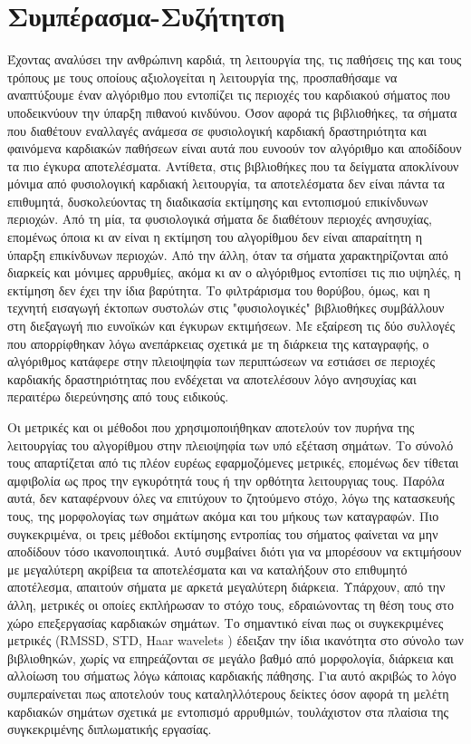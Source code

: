 \gr
\chapter{Συμπέρασμα-Συζήτητση}
Έχοντας αναλύσει την ανθρώπινη καρδιά, τη λειτουργία της, τις παθήσεις της και τους τρόπους με τους οποίους αξιολογείται η λειτουργία της, προσπαθήσαμε να αναπτύξουμε έναν αλγόριθμο που εντοπίζει τις περιοχές του καρδιακού σήματος που υποδεικνύουν την ύπαρξη πιθανού κινδύνου. Όσον αφορά τις βιβλιοθήκες, τα σήματα που διαθέτουν εναλλαγές ανάμεσα σε φυσιολογική καρδιακή δραστηριότητα και φαινόμενα καρδιακών παθήσεων είναι αυτά που ευνοούν τον αλγόριθμο και αποδίδουν τα πιο έγκυρα αποτελέσματα. Αντίθετα, στις βιβλιοθήκες που τα δείγματα αποκλίνουν μόνιμα από φυσιολογική καρδιακή λειτουργία, τα αποτελέσματα δεν είναι πάντα τα επιθυμητά, δυσκολεύοντας τη διαδικασία εκτίμησης και εντοπισμού επικίνδυνων περιοχών. Από τη μία, τα φυσιολογικά σήματα δε διαθέτουν περιοχές ανησυχίας, επομένως όποια κι αν είναι η εκτίμηση του αλγορίθμου δεν είναι απαραίτητη η ύπαρξη επικίνδυνων περιοχών. Από την άλλη, όταν τα σήματα χαρακτηρίζονται από διαρκείς και μόνιμες αρρυθμίες, ακόμα κι αν ο αλγόριθμος εντοπίσει τις πιο υψηλές, η εκτίμηση δεν έχει την ίδια βαρύτητα. Το φιλτράρισμα του θορύβου, όμως, και η τεχνητή εισαγωγή  έκτοπων συστολών στις "φυσιολογικές" βιβλιοθήκες συμβάλλουν στη διεξαγωγή πιο ευνοϊκών και έγκυρων εκτιμήσεων.  Με εξαίρεση τις δύο συλλογές που απορρίφθηκαν λόγω ανεπάρκειας σχετικά με τη διάρκεια της καταγραφής, ο αλγόριθμος κατάφερε στην πλειοψηφία των περιπτώσεων να εστιάσει σε περιοχές καρδιακής δραστηριότητας που ενδέχεται να αποτελέσουν λόγο ανησυχίας και περαιτέρω διερεύνησης από τους ειδικούς.
\par
Οι μετρικές και οι μέθοδοι που χρησιμοποιήθηκαν αποτελούν τον πυρήνα της λειτουργίας του αλγορίθμου στην πλειοψηφία των υπό εξέταση σημάτων. Το σύνολό τους απαρτίζεται από τις πλέον ευρέως εφαρμοζόμενες μετρικές, επομένως δεν τίθεται αμφιβολία ως προς την εγκυρότητά τους ή την ορθότητα λειτουργιας τους. Παρόλα αυτά, δεν καταφέρνουν όλες να επιτύχουν το ζητούμενο στόχο, λόγω της κατασκευής τους, της μορφολογίας των σημάτων ακόμα και του μήκους των καταγραφών. Πιο συγκεκριμένα, οι τρεις μέθοδοι εκτίμησης εντροπίας του σήματος φαίνεται να μην αποδίδουν τόσο ικανοποιητικά. Αυτό συμβαίνει διότι για να μπορέσουν να εκτιμήσουν με μεγαλύτερη ακρίβεια τα αποτελέσματα και να καταλήξουν στο επιθυμητό αποτέλεσμα, απαιτούν σήματα με αρκετά μεγαλύτερη διάρκεια. Υπάρχουν, από την άλλη, μετρικές οι οποίες εκπλήρωσαν το στόχο τους, εδραιώνοντας τη θέση τους στο χώρο επεξεργασίας καρδιακών σημάτων. Το σημαντικό είναι πως οι συγκεκριμένες μετρικές (\en RMSSD, STD, Haar wavelets \gr)  έδειξαν την ίδια ικανότητα στο σύνολο των βιβλιοθηκών, χωρίς να επηρεάζονται σε μεγάλο βαθμό από μορφολογία, διάρκεια και αλλοίωση του σήματως λόγω κάποιας καρδιακής πάθησης. Για αυτό ακριβώς το λόγο συμπεραίνεται πως αποτελούν τους καταληλλότερους δείκτες όσον αφορά τη μελέτη καρδιακών σημάτων σχετικά με εντοπισμό αρρυθμιών, τουλάχιστον στα πλαίσια της συγκεκριμένης διπλωματικής εργασίας. 
